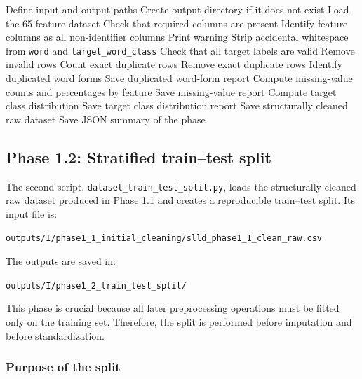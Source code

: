 \documentclass{ipgpmaster}
\begin{document}
\begin{algorithm}[H]
\caption{Phase 1.1: Initial dataset cleaning}
\begin{algorithmic}[1]
\State Define input and output paths
\State Create output directory if it does not exist
\State Load the 65-feature dataset
\State Check that required columns are present
\State Identify feature columns as all non-identifier columns
    \State Print warning
\EndIf
\State Strip accidental whitespace from \texttt{word} and \texttt{target\_word\_class}
\State Check that all target labels are valid
    \State Remove invalid rows
\EndIf
\State Count exact duplicate rows
\State Remove exact duplicate rows
\State Identify duplicated word forms
\State Save duplicated word-form report
\State Compute missing-value counts and percentages by feature
\State Save missing-value report
\State Compute target class distribution
\State Save target class distribution report
\State Save structurally cleaned raw dataset
\State Save JSON summary of the phase
\end{algorithmic}
\end{algorithm}

\subsection{Phase 1.2: Stratified train--test split}

The second script, \texttt{dataset\_train\_test\_split.py}, loads the structurally cleaned raw dataset produced in Phase 1.1 and creates a reproducible train--test split. Its input file is:

\begin{center}
\texttt{outputs/I/phase1\_1\_initial\_cleaning/slld\_phase1\_1\_clean\_raw.csv}
\end{center}

The outputs are saved in:

\begin{center}
\texttt{outputs/I/phase1\_2\_train\_test\_split/}
\end{center}

This phase is crucial because all later preprocessing operations must be fitted only on the training set. Therefore, the split is performed before imputation and before standardization.

\subsubsection{Purpose of the split}
\end{document}
